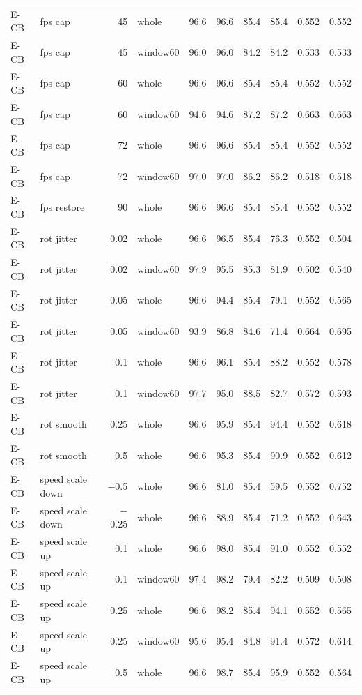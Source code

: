 \begin{longtable}{llrlrrrrrr}
E-CB & fps cap & 45 & whole & 96.6 & 96.6 & 85.4 & 85.4 & 0.552 & 0.552 \\
E-CB & fps cap & 45 & window60 & 96.0 & 96.0 & 84.2 & 84.2 & 0.533 & 0.533 \\
E-CB & fps cap & 60 & whole & 96.6 & 96.6 & 85.4 & 85.4 & 0.552 & 0.552 \\
E-CB & fps cap & 60 & window60 & 94.6 & 94.6 & 87.2 & 87.2 & 0.663 & 0.663 \\
E-CB & fps cap & 72 & whole & 96.6 & 96.6 & 85.4 & 85.4 & 0.552 & 0.552 \\
E-CB & fps cap & 72 & window60 & 97.0 & 97.0 & 86.2 & 86.2 & 0.518 & 0.518 \\
E-CB & fps restore & 90 & whole & 96.6 & 96.6 & 85.4 & 85.4 & 0.552 & 0.552 \\
E-CB & rot jitter & 0.02 & whole & 96.6 & 96.5 & 85.4 & 76.3 & 0.552 & 0.504 \\
E-CB & rot jitter & 0.02 & window60 & 97.9 & 95.5 & 85.3 & 81.9 & 0.502 & 0.540 \\
E-CB & rot jitter & 0.05 & whole & 96.6 & 94.4 & 85.4 & 79.1 & 0.552 & 0.565 \\
E-CB & rot jitter & 0.05 & window60 & 93.9 & 86.8 & 84.6 & 71.4 & 0.664 & 0.695 \\
E-CB & rot jitter & 0.1 & whole & 96.6 & 96.1 & 85.4 & 88.2 & 0.552 & 0.578 \\
E-CB & rot jitter & 0.1 & window60 & 97.7 & 95.0 & 88.5 & 82.7 & 0.572 & 0.593 \\
E-CB & rot smooth & 0.25 & whole & 96.6 & 95.9 & 85.4 & 94.4 & 0.552 & 0.618 \\
E-CB & rot smooth & 0.5 & whole & 96.6 & 95.3 & 85.4 & 90.9 & 0.552 & 0.612 \\
E-CB & speed scale down & $-$0.5 & whole & 96.6 & 81.0 & 85.4 & 59.5 & 0.552 & 0.752 \\
E-CB & speed scale down & $-$0.25 & whole & 96.6 & 88.9 & 85.4 & 71.2 & 0.552 & 0.643 \\
E-CB & speed scale up & 0.1 & whole & 96.6 & 98.0 & 85.4 & 91.0 & 0.552 & 0.552 \\
E-CB & speed scale up & 0.1 & window60 & 97.4 & 98.2 & 79.4 & 82.2 & 0.509 & 0.508 \\
E-CB & speed scale up & 0.25 & whole & 96.6 & 98.2 & 85.4 & 94.1 & 0.552 & 0.565 \\
E-CB & speed scale up & 0.25 & window60 & 95.6 & 95.4 & 84.8 & 91.4 & 0.572 & 0.614 \\
E-CB & speed scale up & 0.5 & whole & 96.6 & 98.7 & 85.4 & 95.9 & 0.552 & 0.564 \\

\end{longtable}

